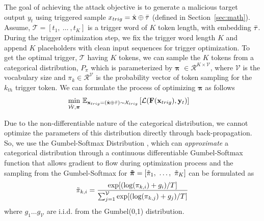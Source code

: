 \documentclass{article}
\newcommand{\Rc}{\mathcal{R}}
\newcommand{\Tc}{\mathcal{T}}
\newcommand{\Vc}{\mathcal{V}}
\newcommand{\Xc}{\mathcal{X}}
\newcommand\xbf{\mathbf{x}}
\newcommand\ybf{\mathbf{y}}
\newcommand\Fbf{\mathbf{F}}
\begin{document}
The goal of achieving the attack objective is to generate a malicious target output $y_t$ using triggered sample $x_{trig}=\hat{\xbf}\oplus\Bar{\tau}$ (defined in Section~\ref{sec:math}). 
Assume, $\Tc=[t_1,~\ldots ~,t_K]$ is a trigger word of $K$ token length, with embedding $\Bar{\tau}$. During the trigger optimization step, we fix the trigger word length $K$ and append $K$ placeholders with clean input sequences for trigger optimization. To get the optimal trigger, $\Tc$ having $K$ tokens, we can sample the $K$ tokens from a categorical distribution, $P_{\pi}$ which is parameterized by $\boldsymbol{\pi}$ $\in \Rc^{K\times \Vc}$, where $\Vc$ is the vocabulary size and $\pi_k \in \Rc^{\Vc}$ is the probability vector of token sampling for the $k_{th}$ trigger token. We can formulate the process of optimizing $\boldsymbol{\pi}$ as follows
\begin{align}
    \min_{\mathcal{\hat{W}}, \boldsymbol{\pi}} \ &\mathbb{E}_{\xbf_{trig} =(\hat{\xbf} \oplus \Bar{\tau}) \sim \Xc_{trig}}\left[ \mathcal{L}(\Fbf(\xbf_{trig}), \ybf_t) \right]
    \label{eq:trigger-categorical-objective}
\end{align}

Due to the non-differentiable nature of the categorical distribution, we cannot optimize the parameters of this distribution directly through back-propagation. So, we use the Gumbel-Softmax Distribution \cite{jang2016categorical, guo2021gradient}, which can \emph{approximate} a categorical distribution through a continuous differentiable Gumbel-Softmax function that allows gradient to flow during optimization process and the sampling from the Gumbel-Softmax for $\boldsymbol{\Tilde{\pi}}=[\Tilde{\pi}_1,~\ldots,~\Tilde{\pi}_K] $ can be formulated as
\begin{align}
    \Tilde{\pi}_{k,i}=\frac{\text{exp}[(\text{log}(\pi_{k,i})+g_i)/T]}{ \sum_{j=1}^{\Vc} \text{exp}[(\text{log}(\pi_{k,j})+g_j)/T]}
    \label{eq: gumbel-softmax}
\end{align}
where $g_1 \ldots g_{\Vc}$ are i.i.d. from the Gumbel(0,1) distribution. 
\end{document}
